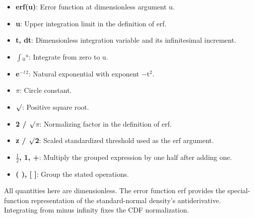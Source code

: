 \documentclass[11pt,a4paper]{article}
\begin{document}
\begin{minipage}{\linewidth}
\begin{itemize}\setlength{\itemsep}{1pt}\setlength{\parsep}{0pt}
\item \textbf{erf(u)}: Error function at dimensionless argument u.
\item \textbf{u}: Upper integration limit in the definition of erf.
\item \textbf{t, dt}: Dimensionless integration variable and its infinitesimal increment.
\item \textbf{\ensuremath{\int}\ensuremath{{}_0}\ensuremath{{}^u}}: Integrate from zero to u.
\item \textbf{e\ensuremath{{}^-}\ensuremath{{}^t}\ensuremath{{}^2}}: Natural exponential with exponent \ensuremath{-}t\ensuremath{{}^2}.
\item \textbf{\ensuremath{\pi}}: Circle constant.
\item \textbf{\ensuremath{\sqrt{\vphantom{x}}}}: Positive square root.
\item \textbf{2 / \ensuremath{\sqrt{\vphantom{x}}}\ensuremath{\pi}}: Normalizing factor in the definition of erf.
\item \textbf{z / \ensuremath{\sqrt{\vphantom{x}}}2}: Scaled standardized threshold used as the erf argument.
\item \textbf{\ensuremath{\tfrac12}, 1, +}: Multiply the grouped expression by one half after adding one.
\item \textbf{( ), [ ]}: Group the stated operations.
\end{itemize}

All quantities here are dimensionless. The error function erf provides the special-function representation of the standard-normal density's antiderivative. Integrating from minus infinity fixes the CDF normalization.

\end{minipage}\par
\medskip
\end{document}
